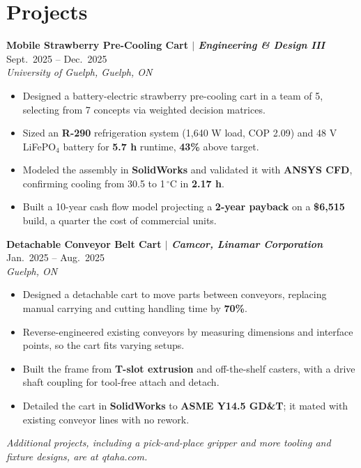 \documentclass[11pt, letterpaper]{article}
\newcommand{\workEntry}[3]{%
  \noindent\textbf{#1} \hfill #2 \\
  \textit{#3}\vspace{0.5pt}
}
\newenvironment{resumelist}{%
  \begin{itemize}[leftmargin=1.5em, itemsep=0.5pt, topsep=1pt, parsep=0pt]
}{%
  \end{itemize}\vspace{0.5pt}
}
\begin{document}
\section{Projects}

\workEntry{Mobile Strawberry Pre-Cooling Cart \textnormal{$|$ \itshape Engineering \& Design III}}{Sept.~2025 -- Dec.~2025}{University of Guelph, Guelph, ON}
\begin{resumelist}
    \item Designed a battery-electric strawberry pre-cooling cart in a team of 5, selecting from 7 concepts via weighted decision matrices.
    \item Sized an \textbf{R-290} refrigeration system (1,640 W load, COP 2.09) and 48 V LiFePO$_4$ battery for \textbf{5.7 h} runtime, \textbf{43\%} above target.
    \item Modeled the assembly in \textbf{SolidWorks} and validated it with \textbf{ANSYS CFD}, confirming cooling from 30.5 to 1\,$^\circ$C in \textbf{2.17 h}.
    \item Built a 10-year cash flow model projecting a \textbf{2-year payback} on a \textbf{\$6,515} build, a quarter the cost of commercial units.
\end{resumelist}

\workEntry{Detachable Conveyor Belt Cart \textnormal{$|$ \itshape Camcor, Linamar Corporation}}{Jan.~2025 -- Aug.~2025}{Guelph, ON}
\begin{resumelist}
    \item Designed a detachable cart to move parts between conveyors, replacing manual carrying and cutting handling time by \textbf{70\%}.
    \item Reverse-engineered existing conveyors by measuring dimensions and interface points, so the cart fits varying setups.
    \item Built the frame from \textbf{T-slot extrusion} and off-the-shelf casters, with a drive shaft coupling for tool-free attach and detach.
    \item Detailed the cart in \textbf{SolidWorks} to \textbf{ASME Y14.5 GD\&T}; it mated with existing conveyor lines with no rework.
\end{resumelist}
\vspace{2pt}
\noindent\textit{Additional projects, including a pick-and-place gripper and more tooling and fixture designs, are at qtaha.com.}
\end{document}
